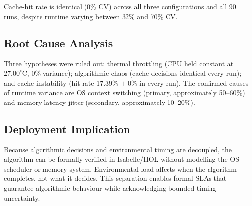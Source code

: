 Cache-hit rate is identical (0\% CV) across all three configurations and all 90 runs,
despite runtime varying between 32\% and 70\% CV.

\subsection{Root Cause Analysis}

Three hypotheses were ruled out: thermal throttling (CPU held constant at
$27.00^\circ$C, 0\% variance); algorithmic chaos (cache decisions identical every run);
and cache instability (hit rate 17.39\% $\pm$ 0\% in every run). The confirmed causes
of runtime variance are OS context switching (primary, approximately 50--60\%) and
memory latency jitter (secondary, approximately 10--20\%).

\subsection{Deployment Implication}

Because algorithmic decisions and environmental timing are decoupled, the algorithm
can be formally verified in Isabelle/HOL without modelling the OS scheduler or memory
system. Environmental load affects when the algorithm completes, not what it decides.
This separation enables formal SLAs that guarantee algorithmic behaviour while
acknowledging bounded timing uncertainty.
